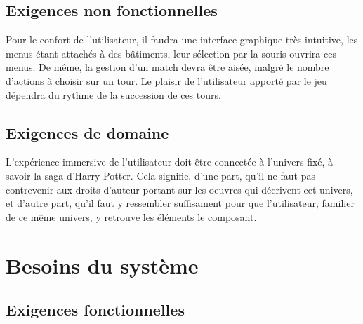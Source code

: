 \documentclass[a4paper,titlepage]{scrreprt}
\begin{document}
\section{Exigences non fonctionnelles}
  Pour le confort de l'utilisateur, il faudra  une interface graphique très intuitive, 
  les menus étant attachés à des  bâtiments, leur sélection par la souris ouvrira ces menus.
  De même, la gestion d'un match devra être aisée, malgré le nombre d'actions à choisir 
  sur un tour. Le plaisir de l'utilisateur apporté par le jeu dépendra du rythme de la succession de ces tours.
\section{Exigences de domaine}
  L'expérience immersive de l'utilisateur doit être connectée à l'univers fixé, 
  à savoir la saga d'Harry Potter. Cela signifie, d'une part, 
  qu'il ne faut pas contrevenir aux droits d'auteur portant sur les oeuvres 
  qui décrivent cet univers, et d'autre part, qu'il faut y ressembler suffisament pour que 
  l'utilisateur, familier de ce même univers, y retrouve les éléments le composant.

\chapter{Besoins du système}
\section{Exigences fonctionnelles}
\end{document}
